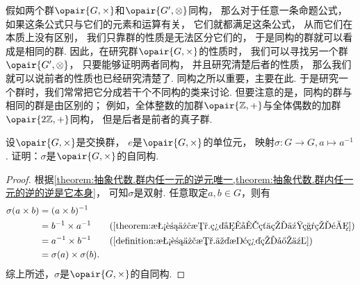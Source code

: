 假如两个群\(\opair{G,\times}\)和\(\opair{G',\otimes}\)同构，
那么对于任意一条命题公式，
如果这条公式只与它们的元素和运算有关，
它们就都满足这条公式，
从而它们在本质上没有区别，
我们只靠群的性质是无法区分它们的，
于是同构的群就可以看成是相同的群.
因此，在研究群\(\opair{G,\times}\)的性质时，
我们可以寻找另一个群\(\opair{G',\otimes}\)，
只要能够证明两者同构，
并且研究清楚后者的性质，
那么我们就可以说前者的性质也已经研究清楚了.
同构之所以重要，主要在此.
于是研究一个群时，我们常常把它分成若干个不同构的类来讨论.
但要注意的是，同构的群与相同的群是由区别的；
例如，全体整数的加群\(\opair{\mathbb{Z},+}\)与全体偶数的加群\(\opair{2\mathbb{Z},+}\)同构，
但是后者是前者的真子群.

\begin{example}
设\(\opair{G,\times}\)是交换群，
\(e\)是\(\opair{G,\times}\)的单位元，
映射\(\sigma\colon G\to G, a\mapsto a^{-1}\).
证明：\(\sigma\)是\(\opair{G,\times}\)的自同构.
\begin{proof}
根据\cref{theorem:抽象代数.群内任一元的逆元唯一,theorem:抽象代数.群内任一元的逆的逆是它本身}，
可知\(\sigma\)是双射.
任意取定\(a,b\in G\)，则有
\begin{align*}
	\sigma(a \times b)
	&= (a \times b)^{-1} \\
	&= b^{-1} \times a^{-1}
		\tag{\cref{theorem:抽象代数.群内元素的乘积的逆}} \\
	&= a^{-1} \times b^{-1}
		\tag{\cref{definition:抽象代数.交换群的定义}} \\
	&= \sigma(a) \times \sigma(b).
\end{align*}
综上所述，\(\sigma\)是\(\opair{G,\times}\)的自同构.
\end{proof}
\end{example}

